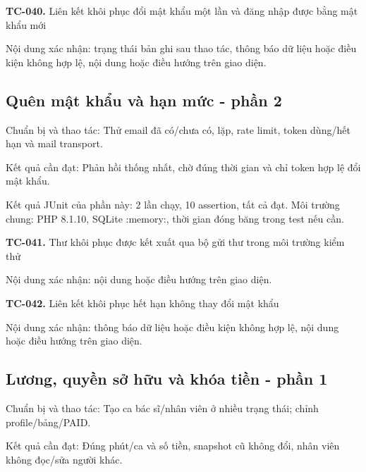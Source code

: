 \noindent\textbf{TC-040.} Liên kết khôi phục đổi mật khẩu một lần và đăng nhập được bằng mật khẩu mới\par
Nội dung xác nhận:\allowbreak{} trạng thái bản ghi sau thao tác, thông báo dữ liệu hoặc điều kiện không hợp lệ, nội dung hoặc điều hướng trên giao diện.\allowbreak{}


\par\vspace{8pt}

\subsection{Quên mật khẩu và hạn mức - phần 2}
Chuẩn bị và thao tác:\allowbreak{} Thử email đã có/\allowbreak{}chưa có, lặp, rate limit, token dùng/\allowbreak{}hết hạn và mail transport.\allowbreak{}

Kết quả cần đạt:\allowbreak{} Phản hồi thống nhất, chờ đúng thời gian và chỉ token hợp lệ đổi mật khẩu.\allowbreak{}

Kết quả JUnit của phần này:\allowbreak{} 2 lần chạy, 10 assertion, tất cả đạt.\allowbreak{} Môi trường chung:\allowbreak{} PHP 8.\allowbreak{}1.\allowbreak{}10, SQLite :\allowbreak{}memory:\allowbreak{}, thời gian đóng băng trong test nếu cần.\allowbreak{}

\noindent\textbf{TC-041.} Thư khôi phục được kết xuất qua bộ gửi thư trong môi trường kiểm thử\par
Nội dung xác nhận:\allowbreak{} nội dung hoặc điều hướng trên giao diện.\allowbreak{}

\noindent\textbf{TC-042.} Liên kết khôi phục hết hạn không thay đổi mật khẩu\par
Nội dung xác nhận:\allowbreak{} thông báo dữ liệu hoặc điều kiện không hợp lệ, nội dung hoặc điều hướng trên giao diện.\allowbreak{}


\par\vspace{8pt}

\subsection{Lương, quyền sở hữu và khóa tiền - phần 1}
Chuẩn bị và thao tác:\allowbreak{} Tạo ca bác sĩ/\allowbreak{}nhân viên ở nhiều trạng thái; chỉnh profile/\allowbreak{}bảng/\allowbreak{}PAID.\allowbreak{}

Kết quả cần đạt:\allowbreak{} Đúng phút/\allowbreak{}ca và số tiền, snapshot cũ không đổi, nhân viên không đọc/\allowbreak{}sửa người khác.\allowbreak{}

